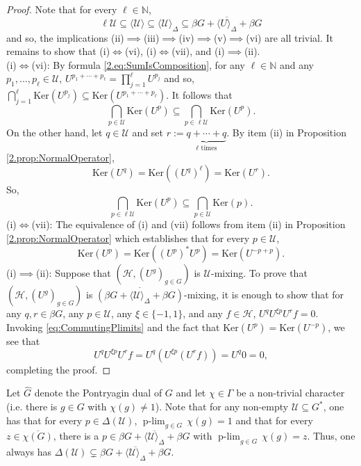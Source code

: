 \documentclass[graybox]{svmult}
\theoremstyle{definition}
\newcommand{\N}{\mathbb{N}}
\newcommand{\plimgG}[3]{\mathop {#1\text{-lim}}_{#2\in #3}\,}
\begin{document}
\begin{proof}
    Note that for every $\ell\in\N$, 
    $$\ell\mathcal U\subseteq \langle \mathcal U \rangle\subseteq \langle \mathcal U\rangle_\Delta\subseteq \overline{\beta G+\langle U\rangle_\Delta+\beta G}$$
    and so, the implications (ii)$\implies$(iii)$\implies$(iv)$\implies$(v)$\implies$(vi) are all trivial. 
    It remains to show that (i)$\iff$(vi), (i)$\iff$(vii), and (i)$\implies$(ii).\\ 
    (i)$\iff$(vi): By formula \eqref{2.eq:SumIsComposition}, for any $\ell \in \mathbb{N}$ and any $p_1,...,p_\ell\in\mathcal U$, $U^{p_1+\cdots+p_\ell}=\prod_{j=1}^\ell U^{p_j}$ and so, 
    $\bigcap_{j=1}^\ell \text{Ker}(U^{p_j})\subseteq \text{Ker}(U^{p_1+\cdots+p_\ell})$. It follows that 
    $$\bigcap_{p\in\mathcal U}\text{Ker}(U^p)\subseteq \bigcap_{p\in\ell\mathcal U}\text{Ker}(U^p).$$
    On the other hand, let $q\in\mathcal U$ and set $r:=\underbrace{q+\cdots+q}_{\ell\text{ times}}$. By item (ii) in Proposition \ref{2.prop:NormalOperator}, 
    $$\text{Ker}(U^q)=\text{Ker}((U^q)^\ell)=\text{Ker}(U^r).$$ 
    So, 
    $$\bigcap_{p\in\ell\mathcal U}\text{Ker}(U^p)\subseteq \bigcap_{p\in\mathcal U}\text{Ker}(p).$$
    (i)$\iff$(vii): The equivalence of (i) and (vii) follows from item (ii) in Proposition \ref{2.prop:NormalOperator} which establishes that for every $p\in\mathcal U$,
    $$
\text{Ker}(U^p)=\text{Ker}((U^p)^*U^p)=\text{Ker}(U^{-p+p}).
    $$
    (i)$\implies$(ii): Suppose that $(\mathcal H,(U^g)_{g\in G})$ is  $\mathcal U$-mixing. To prove that $(\mathcal H,(U^g)_{g\in G})$ is $\overline{(\beta G+\langle\mathcal U\rangle_\Delta+\beta G)}$-mixing, it is enough to show that for any $q,r\in\beta G$, any $p\in\mathcal U$, any $\xi\in \{-1,1\}$, and any $f\in\mathcal H$, $U^qU^{\xi p}U^rf=0$. Invoking \eqref{eq:CommutingPlimits} and the fact that $\text{Ker}(U^p)=\text{Ker}(U^{-p})$, we see that 
    $$
U^q U^{\xi p}U^rf=U^q(U^{\xi  p}(U^rf))=U^q0=0,
    $$
 completing the proof.
\end{proof}
\begin{remark}\label{rem:NonUniqueFamilyForUmixing}
    Let $\widehat G$ denote the Pontryagin dual of $G$ and let $\chi\in\Gamma$ be a non-trivial character (i.e. there is $g\in G$ with $\chi(g)\neq 1$). Note that for any non-empty $\mathcal U\subseteq G^*$, one has that for every $p\in \Delta(\mathcal U)$, $\plimgG{p}{g}{G}\chi(g)=1$ and that for every $z\in \overline{\chi(G)}$, there is a $p\in \overline{\beta G+\langle \mathcal U\rangle_\Delta +\beta G}$ with $\plimgG{p}{g}{G}\chi(g)=z$. Thus, one always has $\Delta(\mathcal{U}) \subsetneq \overline{\beta G+\langle \mathcal U\rangle_\Delta +\beta G}$. 
\end{remark}
\end{document}
